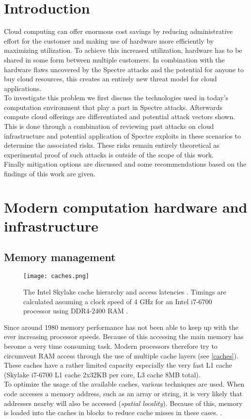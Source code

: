 \documentclass[conference,compsoc,final,a4paper]{IEEEtran}
\begin{document}
\section{Introduction}
Cloud computing can offer enormous cost savings by reducing administrative effort for the customer and making use of hardware more efficiently by maximizing utilization. To achieve this increased utilization, hardware has to be shared in some form between multiple customers. \cite{mell2011nist} In combination with the hardware flaws uncovered by the Spectre attacks and the potential for anyone to buy cloud resources, this creates an entirely new threat model for cloud applications. \\
To investigate this problem we first discuss the technologies used in today's computation environment that play a part in Spectre attacks. Afterwards compute cloud offerings are differentiated and potential attack vectors shown. This is done through a combination of reviewing past attacks on cloud infrastructure and potential application of Spectre exploits in these scenarios to determine the associated risks. These risks remain entirely theoretical as experimental proof of such attacks is outside of the scope of this work. \\
Finally mitigation options are discussed and some recommendations based on the findings of this work are given.

\section{Modern computation hardware and infrastructure}
\subsection{Memory management}
\begin{figure}[!ht]
\centering
\texttt{[image: caches.png]}
\caption{The Intel Skylake cache hierarchy and access latencies \cite{fog2012microarchitecture}. Timings are calculated assuming a clock speed of 4 GHz for an Intel i7-6700 processor using DDR4-2400 RAM \cite{skylakeBenchmark}. }
\label{caches}
\end{figure}
Since around 1980 memory performance has not been able to keep up with the ever increasing processor speeds. \cite[p.~73]{hennessy2011computer} Because of this accessing the main memory has become a very time consuming task. Modern processors therefore try to circumvent RAM access through the use of multiple cache layers (see \autoref{caches}). These caches have a rather limited capacity especially the very fast L1 cache (Skylake i7-6700 L1 cache 2x32KB per core, L3 cache 8MB total). \cite{skylakeBenchmark} \\
To optimize the usage of the available caches, various techniques are used. When code accesses a memory address, such as an array or string, it is very likely that addresses nearby will also be accessed (\emph{spatial locality}). Because of this, memory is loaded into the caches in blocks to reduce cache misses in these cases. \cite[p.~74]{hennessy2011computer}. \\
\end{document}
